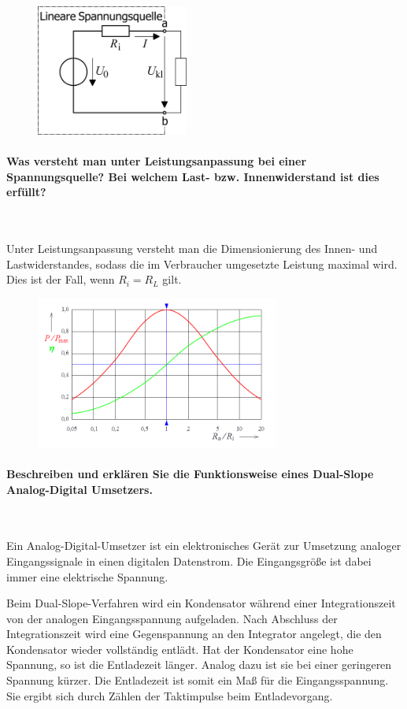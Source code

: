 \documentclass[a4paper, 11pt, ngerman, parskip=half-]{scrartcl}
\begin{document}
\begin{figure}[H]
    \centering
    \includegraphics[width=5cm]{image/04/6}
\end{figure}

\paragraph{Was versteht man unter Leistungsanpassung bei einer Spannungsquelle? Bei welchem Last-
    bzw. Innenwiderstand ist dies erfüllt?} ~

Unter Leistungsanpassung versteht man die Dimensionierung des Innen- und Lastwiderstandes, sodass
die im Verbraucher umgesetzte Leistung maximal wird. Dies ist der Fall, wenn $R_i = R_L$ gilt.

\begin{figure}[H]
    \centering
    \includegraphics[width=8cm]{image/04/7}
\end{figure}

\paragraph{Beschreiben und erklären Sie die Funktionsweise eines Dual-Slope Analog-Digital
    Umsetzers.} ~

Ein Analog-Digital-Umsetzer ist ein elektronisches Gerät zur Umsetzung analoger Eingangssignale in
einen digitalen Datenstrom. Die Eingangsgröße ist dabei immer eine elektrische Spannung.

Beim Dual-Slope-Verfahren wird ein Kondensator während einer Integrationszeit von der analogen
Eingangsspannung aufgeladen. Nach Abschluss der Integrationszeit wird eine Gegenspannung an den
Integrator angelegt, die den Kondensator wieder vollständig entlädt. Hat der Kondensator eine hohe
Spannung, so ist die Entladezeit länger. Analog dazu ist sie bei einer geringeren Spannung kürzer.
Die Entladezeit ist somit ein Maß für die Eingangsspannung. Sie ergibt sich durch Zählen der
Taktimpulse beim Entladevorgang.
\end{document}

